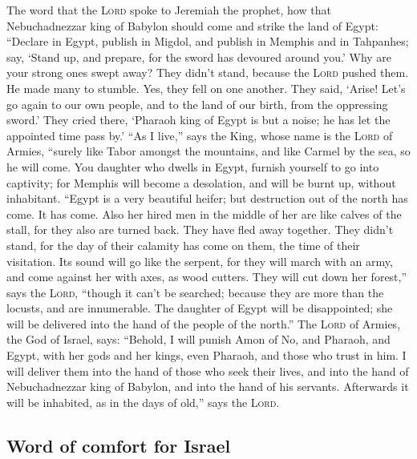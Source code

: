  The word that the \textsc{Lord} spoke to Jeremiah the
prophet, how that Nebuchadnezzar king of Babylon should come and strike
the land of Egypt:  ``Declare in Egypt, publish in
Migdol, and publish in Memphis and in Tahpanhes; say, `Stand up, and
prepare, for the sword has devoured around you.'  Why are
your strong ones swept away? They didn't stand, because the
\textsc{Lord} pushed them.  He made many to stumble. Yes,
they fell on one another. They said, `Arise! Let's go again to our own
people, and to the land of our birth, from the oppressing sword.'
 They cried there, `Pharaoh king of Egypt is but a noise;
he has let the appointed time pass by.'  ``As I live,''
says the King, whose name is the \textsc{Lord} of Armies, ``surely like
Tabor amongst the mountains, and like Carmel by the sea, so he will
come.  You daughter who dwells in Egypt, furnish yourself
to go into captivity; for Memphis will become a desolation, and will be
burnt up, without inhabitant.  ``Egypt is a very
beautiful heifer; but destruction out of the north has come. It has
come.  Also her hired men in the middle of her are like
calves of the stall, for they also are turned back. They have fled away
together. They didn't stand, for the day of their calamity has come on
them, the time of their visitation.  Its sound will go
like the serpent, for they will march with an army, and come against her
with axes, as wood cutters.  They will cut down her
forest,'' says the \textsc{Lord}, ``though it can't be searched; because
they are more than the locusts, and are innumerable.  The
daughter of Egypt will be disappointed; she will be delivered into the
hand of the people of the north.''  The \textsc{Lord} of
Armies, the God of Israel, says: ``Behold, I will punish Amon of No, and
Pharaoh, and Egypt, with her gods and her kings, even Pharaoh, and those
who trust in him.  I will deliver them into the hand of
those who seek their lives, and into the hand of Nebuchadnezzar king of
Babylon, and into the hand of his servants. Afterwards it will be
inhabited, as in the days of old,'' says the \textsc{Lord}.

\hypertarget{word-of-comfort-for-israel}{%
\subsection{Word of comfort for
Israel}\label{word-of-comfort-for-israel}}

